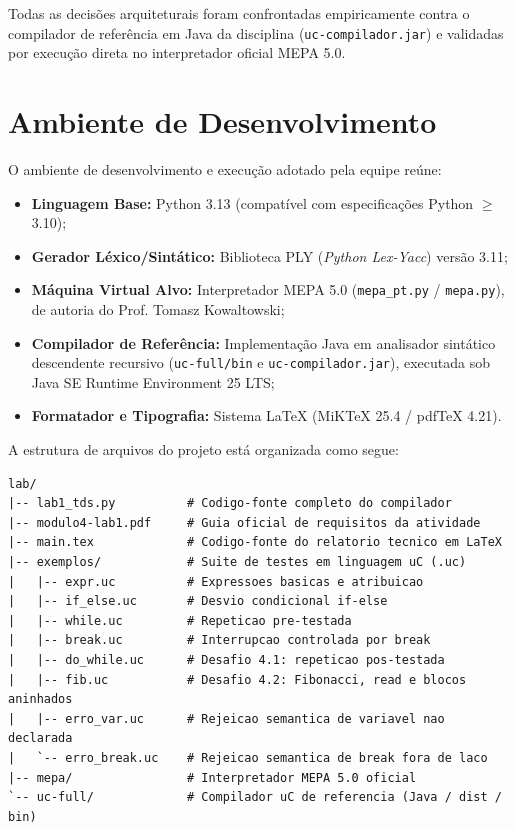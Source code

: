 \documentclass[12pt,a4paper]{article}
\begin{document}
Todas as decisões arquiteturais foram confrontadas empiricamente contra o
compilador de referência em Java da disciplina (\texttt{uc-compilador.jar}) e
validadas por execução direta no interpretador oficial MEPA 5.0.

\section{Ambiente de Desenvolvimento}

O ambiente de desenvolvimento e execução adotado pela equipe reúne:

\begin{itemize}[leftmargin=1.5cm]
    \item \textbf{Linguagem Base:} Python 3.13 (compatível com especificações Python $\ge$ 3.10);
    \item \textbf{Gerador Léxico/Sintático:} Biblioteca PLY (\textit{Python Lex-Yacc}) versão 3.11;
    \item \textbf{Máquina Virtual Alvo:} Interpretador MEPA 5.0 (\texttt{mepa\_pt.py} / \texttt{mepa.py}),
          de autoria do Prof. Tomasz Kowaltowski;
    \item \textbf{Compilador de Referência:} Implementação Java em analisador sintático
          descendente recursivo (\texttt{uc-full/bin} e \texttt{uc-compilador.jar}),
          executada sob Java SE Runtime Environment 25 LTS;
    \item \textbf{Formatador e Tipografia:} Sistema \LaTeX{} (MiKTeX 25.4 / pdf\TeX{} 4.21).
\end{itemize}

A estrutura de arquivos do projeto está organizada como segue:

\begin{lstlisting}[numbers=none]
lab/
|-- lab1_tds.py          # Codigo-fonte completo do compilador
|-- modulo4-lab1.pdf     # Guia oficial de requisitos da atividade
|-- main.tex             # Codigo-fonte do relatorio tecnico em LaTeX
|-- exemplos/            # Suite de testes em linguagem uC (.uc)
|   |-- expr.uc          # Expressoes basicas e atribuicao
|   |-- if_else.uc       # Desvio condicional if-else
|   |-- while.uc         # Repeticao pre-testada
|   |-- break.uc         # Interrupcao controlada por break
|   |-- do_while.uc      # Desafio 4.1: repeticao pos-testada
|   |-- fib.uc           # Desafio 4.2: Fibonacci, read e blocos aninhados
|   |-- erro_var.uc      # Rejeicao semantica de variavel nao declarada
|   `-- erro_break.uc    # Rejeicao semantica de break fora de laco
|-- mepa/                # Interpretador MEPA 5.0 oficial
`-- uc-full/             # Compilador uC de referencia (Java / dist / bin)
\end{lstlisting}
\end{document}
